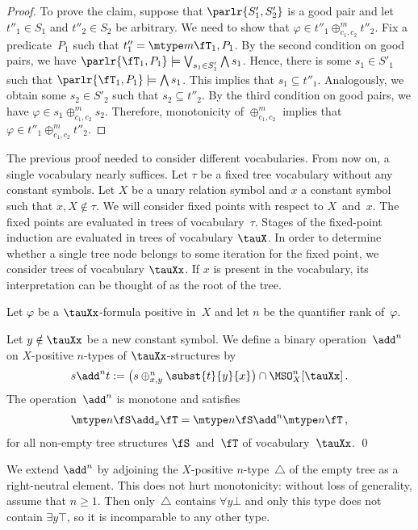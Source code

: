 \documentclass{LMCS}
\begin{document}
\begin{proof}
To prove the claim, suppose that $\parlr{S'_1,S'_2}$ is a good pair
and let $t''_1\in S_1$ and $t''_2\in S_2$ be arbitrary.
We need to show that $\varphi\in t''_1\oplus^m_{c_1,c_2}t''_2$.
Fix a predicate~$P_1$ such that $t''_1=\mtype m{\fT_1,P_1}$.
By the second condition on good pairs, we have
$\parlr{\fT_1,P_1}\models\bigvee_{s_1\in S'_1}\bigwedge s_1$.
Hence, there is some $s_1\in S'_1$ such that $\parlr{\fT_1,P_1}\models\bigwedge s_1$.
This implies that $s_1 \subseteq t''_1$.
Analogously, we obtain some $s_2\in S'_2$ such that $s_2\subseteq t''_2$.
By the third condition on good pairs, we have $\varphi\in s_1\oplus^m_{c_1,c_2}s_2$.
Therefore, monotonicity of $\oplus^m_{c_1,c_2}$ implies that $\varphi\in t''_1\oplus^m_{c_1,c_2}t''_2$.
\end{proof}


The previous proof needed to consider different vocabularies.
From now on, a single vocabulary nearly suffices.
Let $\tau$ be a fixed tree vocabulary without any constant symbols.
Let $X$ be a unary relation symbol and $x$ a constant symbol
such that $x,X \notin \tau$.
We will consider fixed points with respect to $X$~and~$x$.
The fixed points are evaluated in trees of vocabulary~$\tau$.
Stages of the fixed-point induction are evaluated
in trees of vocabulary $\tauX$.
In order to determine whether a single tree node
belongs to some iteration for the fixed point,
we consider trees of vocabulary $\tauXx$.
If $x$ is present in the vocabulary,
its interpretation can be thought of as the root of the tree.

Let $\varphi$ be a $\tauXx$-formula positive in~$X$
and let $n$ be the quantifier rank of~$\varphi$.

\begin{cor}
Let $y \notin \tauXx$ be a new constant symbol.
We define a binary operation~$\add^n$
on $X$-positive $n$-types of $\tauXx$-structures by
\begin{align*}\textstyle
  s \add^n t :=
  \bigl(s \oplus_{x,y}^n \subst{t}{y}{x}\bigr) \cap \MSO^n_X[\tauXx]\,.
\end{align*}
The operation~$\add^n$ is monotone and satisfies
\begin{align*}
  \mtype n{\fS \add_x \fT} = \mtype n{\fS} \add^n \mtype n{\fT}\,,
\end{align*}
for all non-empty tree structures $\fS$~and~$\fT$ of vocabulary~$\tauXx$.
\qed\end{cor}

We extend $\add^n$ by adjoining the $X$-positive $n$-type~$\triangle$ of the empty tree
as a right-neutral element.
This does not hurt monotonicity\?:
without loss of generality, assume that $n\geq 1$.
Then only~$\triangle$ contains $\forall y\bot$
and only this type does not contain $\exists y\top$,
so it is incomparable to any other type.
\end{document}
